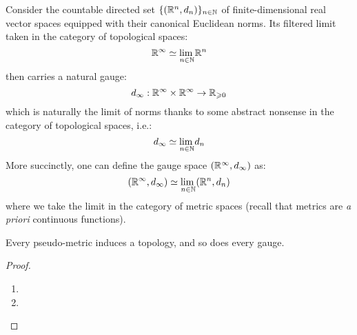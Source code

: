             \begin{example}
                Consider the countable directed set $\{(\mathbb{R}^n, d_n)\}_{n \in \mathbb{N}}$ of finite-dimensional real vector spaces equipped with their canonical Euclidean norms. Its filtered limit taken in the category of topological spaces:
                    $$\mathbb{R}^{\infty} \simeq \underset{n \in \mathbb{N}}{\operatorname{lim} \:} \mathbb{R}^n$$
                then carries a natural gauge:
                    $$d_{\infty}: \R^{\infty} \x \R^{\infty} \to \R_{\geq 0}$$
                which is naturally the limit of norms thanks to some abstract nonsense in the category of topological spaces, i.e.:
                    $$d_{\infty} \simeq \underset{n \in \mathbb{N}}{\operatorname{lim} \:} d_n$$
                More succinctly, one can define the gauge space $(\mathbb{R}^{\infty}, d_{\infty})$ as:
                    $$(\mathbb{R}^{\infty}, d_{\infty}) \simeq \underset{n \in \mathbb{N}}{\operatorname{lim} \:} (\mathbb{R}^n, d_n)$$
                where we take the limit in the category of metric spaces (recall that metrics are \textit{a priori} continuous functions).
            \end{example}
            
            \begin{proposition} \label{prop: topologies_induced_by_pseudo_metrics_and_gauges}
                Every pseudo-metric induces a topology, and so does every gauge.
            \end{proposition}
                \begin{proof}
                   \noindent
                   \begin{enumerate}
                       \item 
                       \item 
                   \end{enumerate}
                \end{proof}
            
